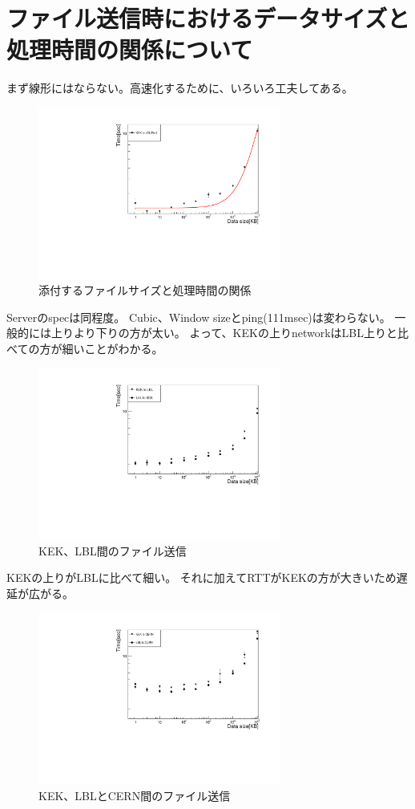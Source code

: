 \chapter{ファイル送信時におけるデータサイズと処理時間の関係について}

まず線形にはならない。高速化するために、いろいろ工夫してある。

\begin{figure}[bpt]\centering
  \begin{center}
    \includegraphics[width=8cm,angle=270]{datasize_vs_time_scp.pdf}
  \caption[添付するファイルサイズと処理時間の関係]{添付するファイルサイズと処理時間の関係}
  \label{datasize_vs_time_scp}
  \end{center}
\end{figure}


Serverのspecは同程度。
Cubic、Window sizeとping(111msec)は変わらない。
一般的には上りより下りの方が太い。
よって、KEKの上りnetworkはLBL上りと比べての方が細いことがわかる。
\begin{figure}[bpt]\centering
  \begin{center}
    \includegraphics[width=8cm,angle=270]{scp_kek_lbl.pdf}
  \caption[KEK、LBL間のファイル送信]{KEK、LBL間のファイル送信}
  \label{datasize_vs_time}
  \end{center}
\end{figure}

KEKの上りがLBLに比べて細い。
それに加えてRTTがKEKの方が大きいため遅延が広がる。
\begin{figure}[bpt]\centering
  \begin{center}
    \includegraphics[width=8cm,angle=270]{scp_to_cern.pdf}
  \caption[KEK、LBLとCERN間のファイル送信]{KEK、LBLとCERN間のファイル送信}
  \label{datasize_vs_time}
  \end{center}
\end{figure}


